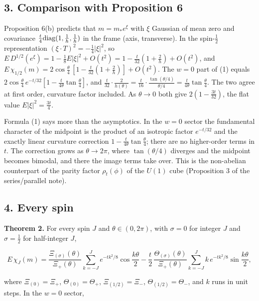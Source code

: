 \documentclass[11pt,a4paper]{article}
\begin{document}
\hypertarget{comparison-with-proposition-6}{%
\subsection{3. Comparison with Proposition
6}\label{comparison-with-proposition-6}}

Proposition 6(b) predicts that \(m=m_*e^\xi\) with \(\xi\) Gaussian of
mean zero and covariance \(\frac t4{\rm diag}(1,\frac1h,\frac1h)\) in
the frame (axis, transverse). In the spin-\(\frac12\) representation
\((\xi\cdot T)^2=-\frac14|\xi|^2\), so
\(E\,D^{1/2}(e^\xi)=1-\frac18E|\xi|^2+O(t^2)=1-\frac t{32}(1+\frac2h)+O(t^2)\),
and
\(E\,\chi_{1/2}(m)=2\cos\frac\theta4\,[1-\frac t{32}(1+\frac2h)]+O(t^2)\).
The \(w=0\) part of (1) equals
\(2\cos\frac\theta4\,e^{-t/32}[1-\frac t{4\theta}\tan\frac\theta4]\),
and
\(\frac t{32}\cdot\frac2{h(\theta)}=\frac t{16}\cdot\frac{\tan(\theta/4)}{\theta/4} =\frac t{4\theta}\tan\frac\theta4\).
The two agree at first order, curvature factor included. As
\(\theta\to0\) both give \(2(1-\frac{3t}{32})\), the flat value
\(E|\xi|^2=\frac{3t}4\).

Formula (1) says more than the asymptotics. In the \(w=0\) sector the
fundamental character of the midpoint is the product of an isotropic
factor \(e^{-t/32}\) and the exactly linear curvature correction
\(1-\frac t{4\theta}\tan\frac\theta4\); there are no higher-order terms
in \(t\). The correction grows as \(\theta\to2\pi\), where
\(\tan(\theta/4)\) diverges and the midpoint becomes bimodal, and there
the image terms take over. This is the non-abelian counterpart of the
parity factor \(\rho_t(\phi)\) of the \(U(1)\) cube (Proposition 3 of
the series/parallel note).

\hypertarget{every-spin}{%
\subsection{4. Every spin}\label{every-spin}}

\textbf{Theorem 2.} For every spin \(J\) and \(\theta\in(0,2\pi)\), with
\(\sigma=0\) for integer \(J\) and \(\sigma=\frac12\) for half-integer
\(J\),

\[E\,\chi_J(m)=\frac{\Xi_{(\sigma)}(\theta)}{\Xi_+(\theta)}
\sum_{k=-J}^{J}e^{-tk^2/8}\cos\frac{k\theta}2
-\frac t2\,\frac{\Theta_{(\sigma)}(\theta)}{\Xi_+(\theta)}
\sum_{k=-J}^{J}k\,e^{-tk^2/8}\sin\frac{k\theta}2,\]

where \(\Xi_{(0)}=\Xi_+\), \(\Theta_{(0)}=\Theta_+\),
\(\Xi_{(1/2)}=\Xi_-\), \(\Theta_{(1/2)}=\Theta_-\), and \(k\) runs in
unit steps. In the \(w=0\) sector,
\end{document}
